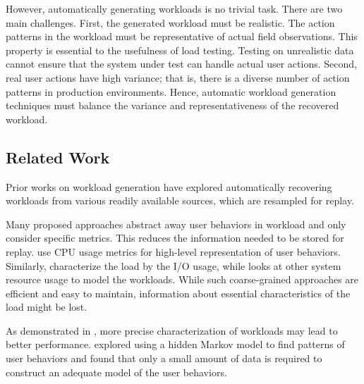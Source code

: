 However, automatically generating workloads is no trivial task. There are two main challenges. First, the generated workload must be realistic. The action patterns in the workload must be representative of actual field observations. This property is essential to the usefulness of load testing. Testing on unrealistic data cannot ensure that the system under test can handle actual user actions. Second, real user actions have high variance; that is, there is a diverse number of action patterns in production environments. Hence, automatic workload generation techniques must balance the variance and representativeness of the recovered workload.

\subsection{Related Work}

Prior works on workload generation have explored automatically recovering workloads from various readily available sources, which are resampled for replay.

Many proposed approaches abstract away user behaviors in workload and only consider specific metrics. This reduces the information needed to be stored for replay. \cite{Shang2015-gj, Cohen2005-mn} use CPU usage metrics for high-level representation of user behaviors. Similarly, \cite{Haghdoost2017-bc, Yadwadkar2010-ml, Busch2015-yo, Seo2014-xv} characterize the load by the I/O usage, while \cite{Cortez2017-nc} looks at other system resource usage to model the workloads. While such coarse-grained approaches are efficient and easy to maintain, information about essential characteristics of the load might be lost.

As demonstrated in \cite{Cohen2005-mn}, more precise characterization of workloads may lead to better performance. \cite{Yadwadkar2010-ml} explored using a hidden Markov model to find patterns of user behaviors and found that only a small amount of data is required to construct an adequate model of the user behaviors.

